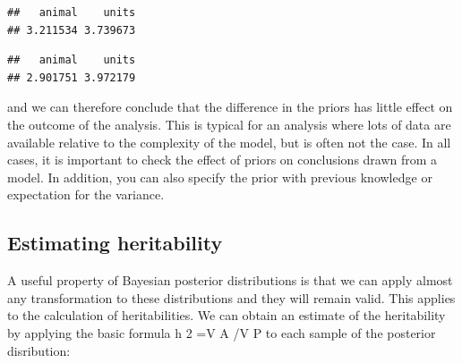 \documentclass[
  12pt,
]{book}
\newenvironment{Shaded}{\begin{snugshade}}{\end{snugshade}}
\newcommand{\FloatTok}[1]{\textcolor[rgb]{0.00,0.00,0.81}{#1}}
\newcommand{\FunctionTok}[1]{\textcolor[rgb]{0.00,0.00,0.00}{#1}}
\newcommand{\NormalTok}[1]{#1}
\newcommand{\OtherTok}[1]{\textcolor[rgb]{0.56,0.35,0.01}{#1}}
\newcommand{\SpecialCharTok}[1]{\textcolor[rgb]{0.00,0.00,0.00}{#1}}
\newcommand{\StringTok}[1]{\textcolor[rgb]{0.31,0.60,0.02}{#1}}
\begin{document}
\begin{verbatim}
##   animal    units 
## 3.211534 3.739673
\end{verbatim}

\begin{Shaded}
\end{Shaded}

\begin{verbatim}
##   animal    units 
## 2.901751 3.972179
\end{verbatim}

and we can therefore conclude that the difference in the priors has little effect on the outcome of the analysis. This is typical for an analysis where lots of data are available relative to the complexity of the model, but is often not the case. In all cases, it is important to check the effect of priors on conclusions drawn from a model. In addition, you can also specify the prior with previous knowledge or expectation for the variance.

\hypertarget{estimating-heritability-1}{%
\subsection{Estimating heritability}\label{estimating-heritability-1}}

A useful property of Bayesian posterior distributions is that we can apply almost any transformation to these distributions and they will remain valid. This applies to the calculation of heritabilities. We can obtain an estimate of the heritability by applying the basic formula h 2 =V A /V P to each sample of the posterior disribution:

\begin{Shaded}
\end{Shaded}
\end{document}
